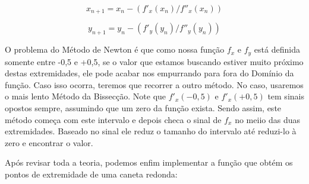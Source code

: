 {{{{{{$$
x_{n+1} = x_{n} - (f'_x(x_n)/f''_x(x_n))
$$

$$
y_{n+1} = y_{n} - (f'_y(y_n)/f''_y(y_n))
$$

O problema do Método de Newton é que como nossa função $f_x$ e $f_y$
está definida somente entre -0,5 e +0,5, se o valor que estamos
buscando estiver muito próximo destas extremidades, ele pode acabar
nos empurrando para fora do Domínio da função. Caso isso ocorra,
teremos que recorrer a outro método. No caso, usaremos o mais lento
Método da Bissecção. Note que $f'_x(-0,5)$ e $f'_x(+0,5)$ tem sinais
opostos sempre, assumindo que um zero da função exista. Sendo assim,
este método começa com este intervalo e depois checa o sinal de $f_x$
no meiio das duas extremidades. Baseado no sinal ele reduz o tamanho
do intervalo até reduzi-lo à zero e encontrar o valor.

Após revisar toda a teoria, podemos enfim implementar a função que
obtém os pontos de extremidade de uma caneta redonda:

}}}}}}
